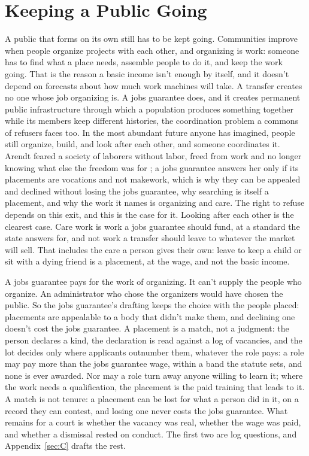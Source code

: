 \chapter{Keeping a Public Going}
\label{ch:keeping}
A public that forms on its own still has to be kept going. Communities improve when people organize projects with each other, and organizing is work: someone has to find what a place needs, assemble people to do it, and keep the work going. That is the reason a basic income isn't enough by itself, and it doesn't depend on forecasts about how much work machines will take. A transfer creates no one whose job organizing is. A jobs guarantee does, and it creates permanent public infrastructure through which a population produces something together while its members keep different histories, the coordination problem a commons of refusers faces too. In the most abundant future anyone has imagined, people still organize, build, and look after each other, and someone coordinates it. Arendt feared a society of laborers without labor, freed from work and no longer knowing what else the freedom was for \autocite{arendt1958human}; a jobs guarantee answers her only if its placements are vocations and not makework, which is why they can be appealed and declined without losing the jobs guarantee, why searching is itself a placement, and why the work it names is organizing and care. The right to refuse depends on this exit, and this is the case for it. Looking after each other is the clearest case. Care work is work a jobs guarantee should fund, at a standard the state answers for, and not work a transfer should leave to whatever the market will sell. That includes the care a person gives their own: leave to keep a child or sit with a dying friend is a placement, at the wage, and not the basic income.

A jobs guarantee pays for the work of organizing. It can't supply the people who organize. An administrator who chose the organizers would have chosen the public. So the jobs guarantee's drafting keeps the choice with the people placed: placements are appealable to a body that didn't make them, and declining one doesn't cost the jobs guarantee. A placement is a match, not a judgment: the person declares a kind, the declaration is read against a log of vacancies, and the lot decides only where applicants outnumber them, whatever the role pays: a role may pay more than the jobs guarantee wage, within a band the statute sets, and none is ever awarded. Nor may a role turn away anyone willing to learn it; where the work needs a qualification, the placement is the paid training that leads to it. A match is not tenure: a placement can be lost for what a person did in it, on a record they can contest, and losing one never costs the jobs guarantee. What remains for a court is whether the vacancy was real, whether the wage was paid, and whether a dismissal rested on conduct. The first two are log questions, and Appendix~\ref{sec:C} drafts the rest.

